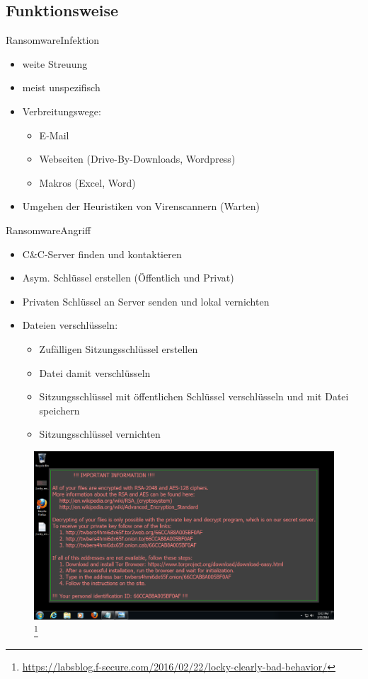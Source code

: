 \documentclass[notes,10pt]{beamer}
\begin{document}
\subsection{Funktionsweise}
\begin{frame}{Ransomware}{Infektion}
		\begin{itemize}
			\item weite Streuung
			\item meist unspezifisch
			\item Verbreitungswege:
				\begin{itemize}
					\item E-Mail
					\item Webseiten (Drive-By-Downloads, Wordpress)
					\item Makros (Excel, Word)
				\end{itemize}
			\item Umgehen der Heuristiken von Virenscannern (Warten)
		\end{itemize}
\end{frame}
\begin{frame}{Ransomware}{Angriff}
		\begin{itemize}
			\item C\&C-Server finden und kontaktieren 
			\item Asym. Schlüssel erstellen (Öffentlich und Privat)
			\item Privaten Schlüssel an Server senden und lokal vernichten
			\item Dateien verschlüsseln:
				\begin{itemize}
					\item Zufälligen Sitzungsschlüssel erstellen
					\item Datei damit verschlüsseln
					\item Sitzungsschlüssel mit öffentlichen Schlüssel verschlüsseln und mit Datei speichern
					\item Sitzungsschlüssel vernichten
				\end{itemize}
		\end{itemize}
\end{frame}

\begin{frame}[plain]
	\begin{figure}[p]
		\centering
		\includegraphics[scale=0.30]{locky-recover-instructions.png}
		\let\thefootnote\relax\footnote{\url{https://labsblog.f-secure.com/2016/02/22/locky-clearly-bad-behavior/}}
	\end{figure}
\end{frame}
\end{document}
